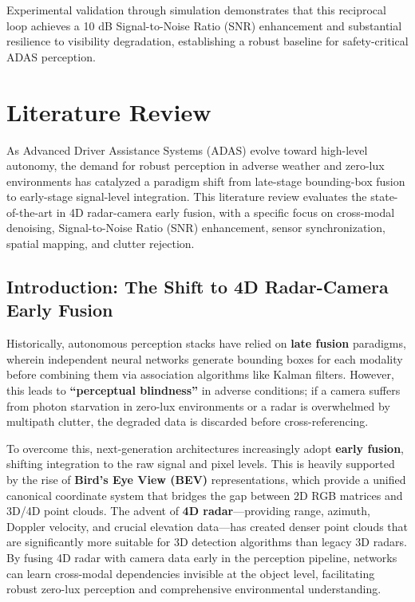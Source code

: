 \documentclass[conference]{IEEEtran}
\begin{document}
Experimental validation through simulation demonstrates that this reciprocal loop achieves a 10 dB Signal-to-Noise Ratio (SNR) enhancement and substantial resilience to visibility degradation, establishing a robust baseline for safety-critical ADAS perception.

\section{Literature Review}
As Advanced Driver Assistance Systems (ADAS) evolve toward high-level autonomy, the demand for robust perception in adverse weather and zero-lux environments has catalyzed a paradigm shift from late-stage bounding-box fusion to early-stage signal-level integration. This literature review evaluates the state-of-the-art in 4D radar-camera early fusion, with a specific focus on cross-modal denoising, Signal-to-Noise Ratio (SNR) enhancement, sensor synchronization, spatial mapping, and clutter rejection. 

\subsection{Introduction: The Shift to 4D Radar-Camera Early Fusion}
Historically, autonomous perception stacks have relied on \textbf{late fusion} paradigms, wherein independent neural networks generate bounding boxes for each modality before combining them via association algorithms like Kalman filters. However, this leads to \textbf{``perceptual blindness''} in adverse conditions; if a camera suffers from photon starvation in zero-lux environments or a radar is overwhelmed by multipath clutter, the degraded data is discarded before cross-referencing. 

To overcome this, next-generation architectures increasingly adopt \textbf{early fusion}, shifting integration to the raw signal and pixel levels. This is heavily supported by the rise of \textbf{Bird's Eye View (BEV)} representations, which provide a unified canonical coordinate system that bridges the gap between 2D RGB matrices and 3D/4D point clouds. The advent of \textbf{4D radar}---providing range, azimuth, Doppler velocity, and crucial elevation data---has created denser point clouds that are significantly more suitable for 3D detection algorithms than legacy 3D radars. By fusing 4D radar with camera data early in the perception pipeline, networks can learn cross-modal dependencies invisible at the object level, facilitating robust zero-lux perception and comprehensive environmental understanding.
\end{document}

